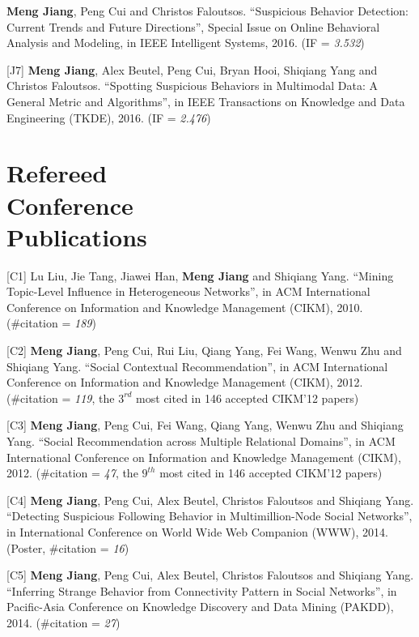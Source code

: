 \documentclass[margin, 10pt]{res}
\begin{document}
\begin{resume}
[J6] \textbf{Meng Jiang}, Peng Cui and Christos Faloutsos. ``Suspicious Behavior Detection: Current Trends and Future Directions'', Special Issue on Online Behavioral Analysis and Modeling, in IEEE Intelligent Systems, 2016. (IF = \textit{3.532})

[J7] \textbf{Meng Jiang}, Alex Beutel, Peng Cui, Bryan Hooi, Shiqiang Yang and Christos Faloutsos. ``Spotting Suspicious Behaviors in Multimodal Data: A General Metric and Algorithms'', in IEEE Transactions on Knowledge and Data Engineering (TKDE), 2016. (IF = \textit{2.476})


\section{Refereed \\ Conference \\ Publications}

[C1] Lu Liu, Jie Tang, Jiawei Han, \textbf{Meng Jiang} and Shiqiang Yang. ``Mining Topic-Level Influence in Heterogeneous Networks'', in ACM International Conference on Information and Knowledge Management (CIKM), 2010. (\#citation = \textit{189})

[C2] \textbf{Meng Jiang}, Peng Cui, Rui Liu, Qiang Yang, Fei Wang, Wenwu Zhu and Shiqiang Yang. ``Social Contextual Recommendation'', in ACM International Conference on Information and Knowledge Management (CIKM), 2012. (\#citation = \textit{119}, the $3^{rd}$ most cited in 146 accepted CIKM'12 papers)

[C3] \textbf{Meng Jiang}, Peng Cui, Fei Wang, Qiang Yang, Wenwu Zhu and Shiqiang Yang. ``Social Recommendation across Multiple Relational Domains'', in ACM International Conference on Information and Knowledge Management (CIKM), 2012. (\#citation = \textit{47}, the $9^{th}$ most cited in 146 accepted CIKM'12 papers)

[C4] \textbf{Meng Jiang}, Peng Cui, Alex Beutel, Christos Faloutsos and Shiqiang Yang. ``Detecting Suspicious Following Behavior in Multimillion-Node Social Networks'', in International Conference on World Wide Web Companion (WWW), 2014. (Poster, \#citation = \textit{16})

[C5] \textbf{Meng Jiang}, Peng Cui, Alex Beutel, Christos Faloutsos and Shiqiang Yang. ``Inferring Strange Behavior from Connectivity Pattern in Social Networks'', in Pacific-Asia Conference on Knowledge Discovery and Data Mining (PAKDD), 2014. (\#citation = \textit{27})


\end{resume}
\end{document}
